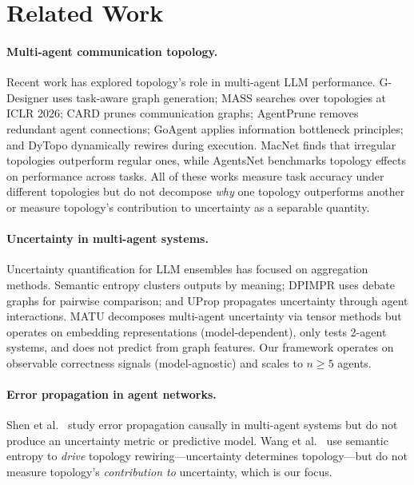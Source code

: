\documentclass{article}
\begin{document}
\section{Related Work}
\label{sec:related}

\paragraph{Multi-agent communication topology.}
Recent work has explored topology's role in multi-agent LLM performance. G-Designer \citep{} uses task-aware graph generation; MASS \citep{} searches over topologies at ICLR 2026; CARD \citep{} prunes communication graphs; AgentPrune \citep{} removes redundant agent connections; GoAgent \citep{} applies information bottleneck principles; and DyTopo \citep{} dynamically rewires during execution. MacNet \citep{} finds that irregular topologies outperform regular ones, while AgentsNet \citep{grotschla2025agentsnet} benchmarks topology effects on performance across tasks. All of these works measure task accuracy under different topologies but do not decompose \emph{why} one topology outperforms another or measure topology's contribution to uncertainty as a separable quantity.

\paragraph{Uncertainty in multi-agent systems.}
Uncertainty quantification for LLM ensembles has focused on aggregation methods. Semantic entropy \citep{} clusters outputs by meaning; DPIMPR \citep{} uses debate graphs for pairwise comparison; and UProp \citep{} propagates uncertainty through agent interactions. MATU \citep{} decomposes multi-agent uncertainty via tensor methods but operates on embedding representations (model-dependent), only tests 2-agent systems, and does not predict from graph features. Our framework operates on observable correctness signals (model-agnostic) and scales to $n \geq 5$ agents.

\paragraph{Error propagation in agent networks.}
Shen et al.\ \citep{shen2025studying} study error propagation causally in multi-agent systems but do not produce an uncertainty metric or predictive model. Wang et al.\ \citep{} use semantic entropy to \emph{drive} topology rewiring---uncertainty determines topology---but do not measure topology's \emph{contribution to} uncertainty, which is our focus.
\end{document}
